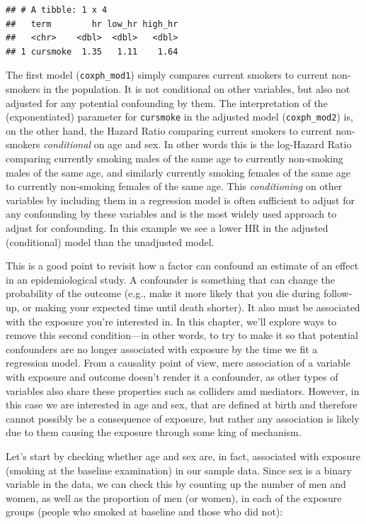 \documentclass[
]{book}
\begin{document}
\begin{verbatim}
## # A tibble: 1 x 4
##   term        hr low_hr high_hr
##   <chr>    <dbl>  <dbl>   <dbl>
## 1 cursmoke  1.35   1.11    1.64
\end{verbatim}

The first model (\texttt{coxph\_mod1}) simply compares current smokers to current non-smokers in the population. It is not conditional on other variables, but also not adjusted for any potential confounding by them. The interpretation of the (exponentiated) parameter for \texttt{cursmoke} in the adjusted model (\texttt{coxph\_mod2}) is, on the other hand, the Hazard Ratio comparing current smokers to current non-smokers \emph{conditional} on age and sex. In other words this is the log-Hazard Ratio comparing currently smoking males of the same age to currently non-smoking males of the same age, and similarly currently smoking females of the same age to currently non-smoking females of the same age. This \emph{conditioning} on other variables by including them in a regression model is often sufficient to adjust for any confounding by these variables and is the most widely used approach to adjust for confounding. In this example we see a lower HR in the adjusted (conditional) model than the unadjusted model.

This is a good point to revisit how a factor can confound an estimate of an effect in an epidemiological study. A confounder is something that can change the probability of the outcome (e.g., make it more likely that you die during follow-up, or making your expected time until death shorter). It also must be associated with the exposure you're interested in. In this chapter, we'll explore ways to remove this second condition---in other words, to try to make it so that potential confounders are no longer associated with exposure by the time we fit a regression model. From a causality point of view, mere association of a variable with exposure and outcome doesn't render it a confounder, as other types of variables also share these properties such as colliders amd mediators. However, in this case we are interested in age and sex, that are defined at birth and therefore cannot possibly be a consequence of exposure, but rather any association is likely due to them causing the exposure through some king of mechanism.

Let's start by checking whether age and sex are, in fact, associated with exposure (smoking at the baseline examination) in our sample data. Since sex is a binary variable in the data, we can check this by counting up the number of men and women, as well as the proportion of men (or women), in each of the exposure groups (people who smoked at baseline and those who did not):
\end{document}
